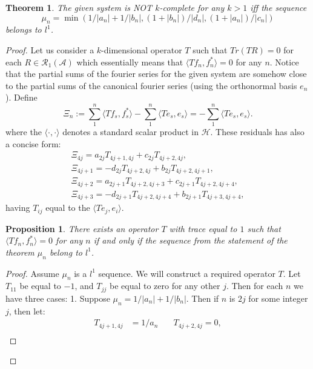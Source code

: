 \documentclass[12pt]{article}
\newcommand\inner[2]{\langle #1, #2 \rangle}
\renewcommand{\cal}[1]{\mathcal{#1}}
\newtheorem{theorem}{Theorem}
\newtheorem{prop}{Proposition}
\theoremstyle{definition}
\numberwithin{remark}{section}
\numberwithin{theorem}{section}
\numberwithin{prop}{section}
\numberwithin{equation}{section}
\numberwithin{lemma}{section}
\numberwithin{prop_under_lemma}{lemma}
\begin{document}
    \begin{theorem}
        The given system is NOT $k$-complete for any $k > 1$ iff the sequence
        $$
            \mu_n = \min(1/|a_n| + 1/|b_n|, (1 + |b_n|)/|d_n|, (1 + |a_n|)/|c_n|)
        $$ belongs to $l^1$.
    \end{theorem}
    \begin{proof}
        Let us consider a $k$-dimensional operator $T$ such that 
        $Tr(TR) = 0$ for each $R \in \cal{R}_1(\cal{A})$ which essentially means that
        $\inner{Tf_n}{f_n^*} = 0$ for any $n$. 
        Notice that the partial sums of the fourier series for the given system are somehow close to the
        partial sums of the canonical fourier series (using the orthonormal basis $e_n$). Define
        $$
          \Xi_n := \sum_1^n \inner{Tf_s}{f_s^*} - \sum_1^n \inner{Te_s}{e_s} = -\sum_1^n \inner{Te_s}{e_s}.
        $$
        where the $\inner{\cdot}{\cdot}$ denotes a standard scalar product in $\cal{H}$.
        These residuals has also a concise form:
        \begin{align*}
            \Xi_{4j} = a_{2j} T_{4j+1, 4j} + c_{2j} T_{4j+2, 4j},\\
            \Xi_{4j + 1} = -d_{2j} T_{4j+2, 4j} + b_{2j} T_{4j+2, 4j+1},\\
            \Xi_{4j + 2} = a_{2j+1} T_{4j+2, 4j+3} + c_{2j+1} T_{4j+2, 4j+4},\\
            \Xi_{4j + 3} = -d_{2j+1} T_{4j+2, 4j+4} + b_{2j+1} T_{4j+3, 4j+4},
        \end{align*}
        having $T_{ij}$ equal to the $\inner{Te_j}{e_i}$.
        \begin{prop}
            \label{inf-dim-statement}
            There exists an operator $T$ with trace equal to $1$ such that
            $\inner{Tf_n}{f_n^*} = 0$ for any $n$ if and only if the
            sequence from the statement of the theorem $\mu_n$ belong to $l^1$.
        \end{prop}
        \begin{proof}
            Assume $\mu_n$ is a $l^1$ sequence. We will construct a required operator $T$.
            Let $T_{11}$ be equal to $-1$, and $T_{jj}$ be equal to zero for any other $j$.
            Then for each $n$ we have three cases:
            1. Suppose $\mu_n = 1/|a_n| + 1/|b_n|$. Then if $n$ is $2j$ for some integer $j$, then
            let:
            \begin{align*}
                T_{4j+1,4j}&=1/a_n & \quad T_{4j+2,4j} = 0,\\

\end{align*}
\end{proof}
\end{proof}
\end{document}
